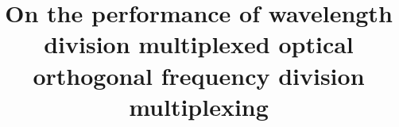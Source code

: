 \documentclass{sig-alternate} %
\begin{document}
\title{On the performance of wavelength division multiplexed optical orthogonal frequency division multiplexing}
\maketitle

\begin{abstract}

\end{abstract}
\end{document}
